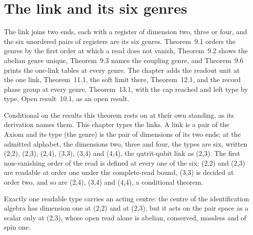 \section{The link and its six genres}\label{mod:I-2-link-and-its-six-genres}
\label{narr:open:1-2}The link joins two ends, each with a register of dimension two, three or four, and the six unordered pairs of registers are its six genres. Theorem~9.1 orders the genres by the first order at which a read does not vanish, Theorem~9.2 shows the abelian genre unique, Theorem~9.3 names the coupling genre, and Theorem~9.6 prints the one-link tables at every genre. The chapter adds the readout unit at the one link, Theorem~11.1, the soft limit there, Theorem~12.1, and the record phase group at every genre, Theorem~13.1, with the cap reached and left type by type, Open result~10.1, as an open result.
\begin{chconditional}\label{box:I-2-link-and-its-six-genres:1}
Conditional on the results this theorem rests on at their own standing, as its derivation names them.
This chapter types the links. A link is a pair of the Axiom and its type (the genre) is the pair of dimensions of its two ends; at the admitted alphabet, the dimensions two, three and four, the types are six, written (2,2), (2,3), (2,4), (3,3), (3,4) and (4,4), the qutrit-qubit link as (2,3). The first non-vanishing order of the read is defined at every one of the six: (2,2) and (2,3) are readable at order one under the complete-read bound, (3,3) is decided at order two, and so are (2,4), (3,4) and (4,4), a conditional theorem.
\end{chconditional}
\begin{chtheorem}\label{box:I-2-link-and-its-six-genres:2}
Exactly one readable type carries an acting centre: the centre of the identification algebra has dimension one at (2,2) and at (2,3), but it acts on the pair space as a scalar only at (2,3), whose open read alone is abelian, conserved, massless and of spin one.
\end{chtheorem}
